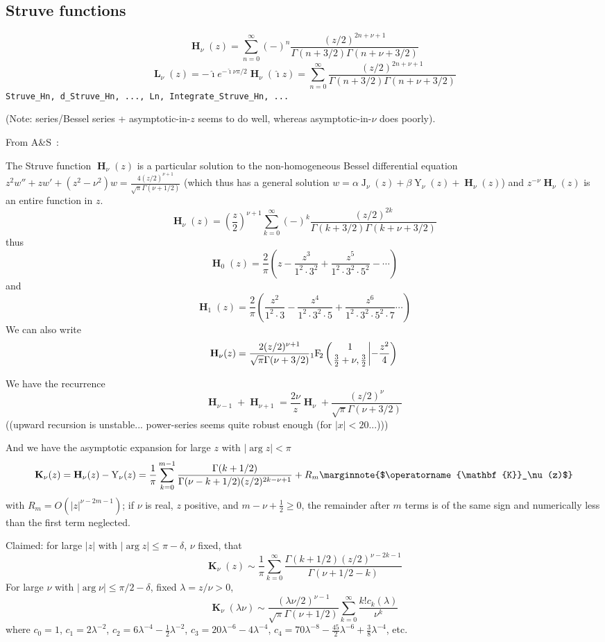 \documentclass[10pt,dvipdfmx,letterpaper,twoside]{article}
\let\O=\operatorname
\newcommand{\Ob}[1]{\operatorname{\mathbf{#1}}}
\newcommand{\ii}{{\hat{\imath}}}
\newcommand{\Hyper}[5]{{\mathop{{}_{#1}\!\O{F\!}_{#2}\left({\genfrac{}{}{0pt}{}{#3}{#4}}\middle|{#5}\right)}}}
\let\DEF=\marginnote
\let\al=\alpha
\let\Gam=\Gamma
\let\lam=\lambda
\begin{document}
\subsection{Struve functions}
\[ \Ob{H}_\nu(z) = \sum_{n=0}^\infty (-)^n \frac{(z/2)^{2n+\nu+1}}{\Gamma(n+3/2)\Gamma(n+\nu+3/2)} \]
\[ \Ob{L}_\nu(z) = -\ii e^{-\ii\nu\pi/2}\O{\mathbf{H}}_\nu(\ii z) = \sum_{n=0}^\infty \frac{(z/2)^{2n+\nu+1}}{\Gamma(n+3/2)\Gamma(n+\nu+3/2)} \]
{\tt Struve\_Hn, d\_Struve\_Hn, ..., Ln, Integrate\_Struve\_Hn, ...}

(Note: series/Bessel series + asymptotic-in-$z$ seems to do well, whereas asymptotic-in-$\nu$ does poorly).

From A\&S~\cite{a&s}:

The Struve function $\Ob{H}_\nu(z)$ is a particular solution to the non-homogeneous Bessel differential equation
$z^2w'' + zw' + (z^2-\nu^2)w = \frac{4(z/2)^{\nu+1}}{\sqrt{\pi}\Gam(\nu+1/2)}$
(which thus has a general solution $w=\al\O{J}_\nu(z) + \beta\O{Y}_\nu(z) + \Ob{H}_\nu(z)$)
and $z^{-\nu}\Ob{H}_\nu(z)$ is an entire function in $z$.
\[ \Ob{H}_\nu(z) = \left(\frac{z}{2}\right)^{\nu+1}\sum_{k=0}^\infty(-)^k\frac{(z/2)^{2k}}{\Gam(k+3/2)\Gam(k+\nu+3/2)} \]
thus
\[ \Ob{H}_0(z) = \frac2\pi\left(z-\frac{z^3}{1^2\cdot3^2}+\frac{z^5}{1^2\cdot3^2\cdot5^2}-\cdots\right) \]
and
\[ \Ob{H}_1(z) = \frac2\pi\left(\frac{z^2}{1^2\cdot3}-\frac{z^4}{1^2\cdot3^2\cdot5}+\frac{z^6}{1^2\cdot3^2\cdot5^2\cdot7}\cdots\right) \]
We can also write
\[ \Ob{H}_\nu(z) = \frac{2(z/2)^{\nu+1}}{\sqrt{\pi} \Gam(\nu+3/2)} \Hyper{1}{2}{1}{\tfrac32+\nu, \tfrac32}{-\frac{z^2}{4}} \]

We have the recurrence
\[ \Ob{H}_{\nu-1} + \Ob{H}_{\nu+1} = \frac{2\nu}{z}\Ob{H}_\nu + \frac{(z/2)^\nu}{\sqrt{\pi} \Gam(\nu+3/2)} \]
((upward recursion is unstable... power-series seems quite robust enough (for $|x|<20$...)))

And we have the asymptotic expansion for large $z$ with $|\arg z|<\pi$
\[ \Ob{K}_\nu(z) = \Ob{H}_\nu(z) - \O{Y}_\nu(z) = \frac{1}{\pi}\sum_{k=0}^{m-1}\frac{\Gam(k+1/2)}{\Gam(\nu-k+1/2)(z/2)^{2k-\nu+1}} + R_m \DEF{$\Ob{K}_\nu(z)$} \]
with $R_m=O(|z|^{\nu-2m-1})$; if $\nu$ is real, $z$ positive, and $m-\nu+\tfrac12\geq0$, the remainder after $m$ terms is of the
same sign and numerically less than the first term neglected.

Claimed: for large $|z|$ with $|\arg z|\leq\pi-\delta$, $\nu$ fixed, that
\[ \Ob{K}_\nu(z) \sim \frac{1}{\pi} \sum_{k=0}^\infty \frac{\Gam(k+1/2)(z/2)^{\nu-2k-1}}{\Gam(\nu+1/2-k)} \]
For large $\nu$ with $|\arg\nu|\leq\pi/2-\delta$, fixed $\lam=z/\nu>0$,
\[ \Ob{K}_\nu(\lam\nu) \sim \frac{(\lam\nu/2)^{\nu-1}}{\sqrt{\pi}\Gam(\nu+1/2)} \sum_{k=0}^\infty \frac{k! c_k(\lam)}{\nu^k} \]
where $c_0=1$, $c_1=2\lam^{-2}$, $c_2=6\lam^{-4}-\frac12\lam^{-2}$, $c_3=20\lam^{-6}-4\lam^{-4}$,
$c_4=70\lam^{-8}-\frac{45}{2}\lam^{-6}+\frac{3}{8}\lam^{-4}$, etc.
\end{document}
